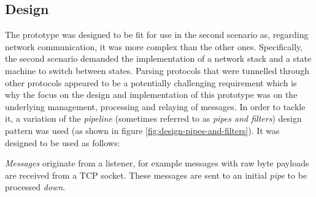 \subsection{Design}
\label{sec:prototype-design}
The prototype was designed to be fit for use in the second scenario as, regarding network communication, it was more complex than the other ones. Specifically, the second scenario demanded the implementation of a network stack and a state machine to switch between states.
Parsing protocols that were tunnelled through other protocols appeared to be a potentially challenging requirement which is why the focus on the design and implementation of this prototype was on the underlying management, processing and relaying of messages. In order to tackle it, a variation of the \emph{pipeline} (sometimes referred to as \emph{pipes and filters}) design pattern was used (as shown in figure \ref{fig:design-pipes-and-filters}). It was designed to be used as follows:\par
\emph{Messages} originate from a listener, for example messages with raw byte payloads are received from a \ac{TCP} socket. These messages are sent to an initial \emph{pipe} to be processed \emph{down}.

